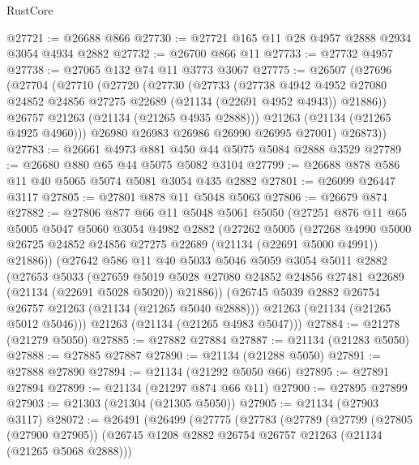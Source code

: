 \begin{lexlean}{RustCore}
\begin{coremodule}
@27721 := @26688 @866
@27730 := @27721 @165 @11 @28 @4957 @2888 @2934 @3054 @4934 @2882
@27732 := @26700 @866 @11
@27733 := @27732 @4957
@27738 := @27065 @132 @74 @11 @3773 @3067
@27775 := @26507
    (@27696
      (@27704
        (@27710
          (@27720
            (@27730
              (@27733
                (@27738
                  @4942
                  @4952
                  @27080
                  @24852
                  @24856
                  @27275
                  @22689
                  (@21134 (@22691 @4952 @4943))
                  @21886))
              @26757
              @21263
              (@21134 (@21265 @4935 @2888)))
            @21263
            (@21134 (@21265 @4925 @4960)))
          @26980
          @26983
          @26986
          @26990
          @26995
          @27001)
        @26873))
@27783 := @26661 @4973 @881 @450 @44 @5075 @5084 @2888 @3529
@27789 := @26680 @880 @65 @44 @5075 @5082 @3104
@27799 := @26688 @878 @586 @11 @40 @5065 @5074 @5081 @3054 @435 @2882
@27801 := @26099 @26447 @3117
@27805 := @27801 @878 @11 @5048 @5063
@27806 := @26679 @874
@27882 := @27806
    @877
    @66
    @11
    @5048
    @5061
    @5050
    (@27251
      @876
      @11
      @65
      @5005
      @5047
      @5060
      @3054
      @4982
      @2882
      (@27262
        @5005
        (@27268
          @4990
          @5000
          @26725
          @24852
          @24856
          @27275
          @22689
          (@21134 (@22691 @5000 @4991))
          @21886))
      (@27642
        @586
        @11
        @40
        @5033
        @5046
        @5059
        @3054
        @5011
        @2882
        (@27653
          @5033
          (@27659
            @5019
            @5028
            @27080
            @24852
            @24856
            @27481
            @22689
            (@21134 (@22691 @5028 @5020))
            @21886))
        (@26745 @5039 @2882 @26754 @26757 @21263 (@21134 (@21265 @5040 @2888)))
        @21263
        (@21134 (@21265 @5012 @5046)))
      @21263
      (@21134 (@21265 @4983 @5047)))
@27884 := @21278 (@21279 @5050)
@27885 := @27882 @27884
@27887 := @21134 (@21283 @5050)
@27888 := @27885 @27887
@27890 := @21134 (@21288 @5050)
@27891 := @27888 @27890
@27894 := @21134 (@21292 @5050 @66)
@27895 := @27891 @27894
@27899 := @21134 (@21297 @874 @66 @11)
@27900 := @27895 @27899
@27903 := @21303 (@21304 (@21305 @5050))
@27905 := @21134 (@27903 @3117)
@28072 := @26491
    (@26499
      (@27775
        (@27783
          (@27789
            (@27799
              (@27805 (@27900 @27905))
              (@26745 @1208 @2882 @26754 @26757 @21263 (@21134 (@21265 @5068 @2888)))

\end{coremodule}
\end{lexlean}
